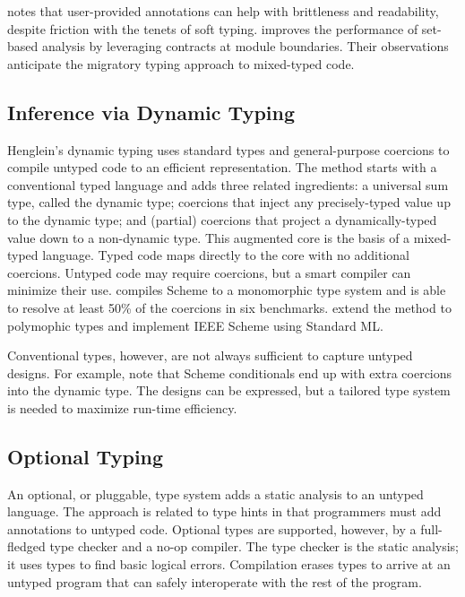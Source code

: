 \documentclass[ twoside,open=right,titlepage,numbers=noenddot,headinclude,%
                footinclude=true,cleardoublepage=empty,abstract=off,
                BCOR=5mm,paper=a4,fontsize=11pt,%
                ngerman,american,%
                parts,pdfspacing]{scrreprt}
\newcommand{\Ssubsubsection}[2]{\subsubsection[#1]{#2}}
\renewcommand{\Ssubsubsection}[2]{\subsection[#1]{#2}}
\begin{document}
 notes that user{-}provided annotations can help with
 brittleness and readability, despite friction with the tenets of soft typing.
 improves the performance of set{-}based analysis
 by leveraging contracts at module boundaries.
Their observations anticipate the migratory typing approach to mixed{-}typed code.

\Ssubsubsection{Inference via Dynamic Typing}{Inference via Dynamic Typing}\label{t:x28part_x22Inferencex5fviax5fDynamicx5fTypingx22x29}

Henglein{'}s dynamic typing uses standard types and general{-}purpose coercions to
 compile untyped code to an efficient representation.
The method starts with a conventional typed language and adds three
 related ingredients:
 a universal sum type, called the dynamic type;
 coercions that inject any precisely{-}typed value up to the dynamic type; and
 (partial) coercions that project a dynamically{-}typed value down to a non{-}dynamic type.
This augmented core is the basis of a mixed{-}typed language.
Typed code maps directly to the core with no additional coercions.
Untyped code may require coercions, but a smart compiler can minimize
 their use.
 compiles Scheme to a monomorphic type system and is able
 to resolve at least 50\% of the coercions in six benchmarks.
 extend the method to polymophic types and
 implement IEEE Scheme using Standard ML.

Conventional types, however, are not always sufficient to capture untyped
 designs.
For example,  note that Scheme conditionals
 end up with extra coercions into the dynamic type.
The designs can be expressed, but a tailored type system is needed to
 maximize run{-}time efficiency.

\Ssubsubsection{Optional Typing}{Optional Typing}\label{t:x28part_x22Optionalx5fTypingx22x29}

An optional, or pluggable, type system adds a static analysis to an untyped
 language.
The approach is related to type hints in that programmers must add
 annotations to untyped code.
Optional types are supported, however, by a full{-}fledged type checker
 and a no{-}op compiler.
The type checker is the static analysis; it uses types to find basic logical errors.
Compilation erases types to arrive at an untyped program that can safely
 interoperate with the rest of the program.
\end{document}
